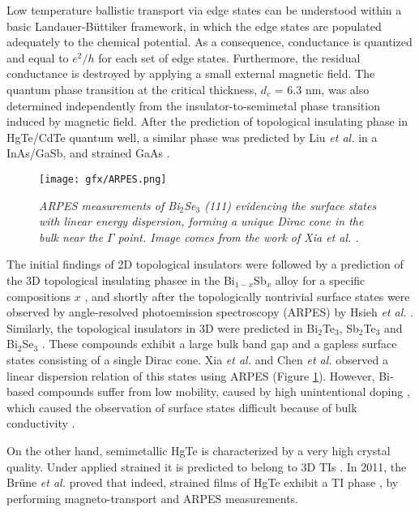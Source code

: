 \documentclass[titlepage,a4paper]{book}
\begin{document}
Low temperature ballistic transport via edge states can be understood within a basic Landauer-Büttiker \cite{Landauer_MCT} framework, in which the edge states are populated adequately to the chemical potential. As a consequence, conductance is quantized and equal to $e^2/h$ for each set of edge states. Furthermore, the residual conductance is destroyed by applying a small external magnetic field. The quantum phase transition at the critical thickness, $d_c$ = 6.3 nm, was also determined independently from the insulator-to-semimetal phase transition induced by magnetic field. After the prediction of topological insulating phase in HgTe/CdTe quantum well, a similar phase was predicted by Liu \textit{et al.} \cite{Liu_Topology} in a InAs/GaSb, and strained GaAs \cite{Bernevig_Topology1}. 

\begin{figure}[ht]
	\centering
	\texttt{[image: gfx/ARPES.png]}
	\vspace{-10pt}
	\caption{\textit{ARPES measurements of Bi$_2$Se$_3$ (111) evidencing the surface states with linear energy dispersion, forming a unique Dirac cone in the bulk near the $\Gamma$ point. Image comes from the work of Xia \textit{et al.} \cite{Xia_Topology}.}}
	\label{fig:ARPES}
\end{figure}

The initial findings of 2D topological insulators were followed by a prediction of the 3D topological insulating phasee in the Bi$_{1-x}$Sb$_x$ alloy for a specific compositions $x$ \cite{Fu_Topology}, and shortly after the topologically nontrivial surface states were observed by angle-resolved photoemission spectroscopy (ARPES) by Hsieh \textit{et al.} \cite{Hsieh}. Similarly, the topological insulators in 3D were predicted in Bi$_2$Te$_3$, Sb$_2$Te$_3$ \cite{Zhang_Topology} and Bi$_2$Se$_3$ \cite{Zhang_Topology}\cite{Xia_Topology}. These compounds exhibit a large bulk band gap and a gapless surface states consisting of a single Dirac cone. Xia \textit{et al.} \cite{Xia_Topology} and Chen \textit{et al.} \cite{Chen_Topology} observed a linear dispersion relation of this states using ARPES (Figure \ref{fig:ARPES}). However, Bi-based compounds suffer from low mobility, caused by high unintentional doping \cite{Brahlek_State}, which caused the observation of surface states difficult because of bulk conductivity \cite{Brune_State2}.

On the other hand, semimetallic HgTe is characterized by a very high crystal quality. Under applied strained it is predicted to belong to 3D TIs \cite{Kane_Fu}. In 2011, the Brüne \textit{et al.} proved that indeed, strained films of HgTe exhibit a TI phase \cite{Brune_State2}, by performing magneto-transport and ARPES measurements.
\end{document}
